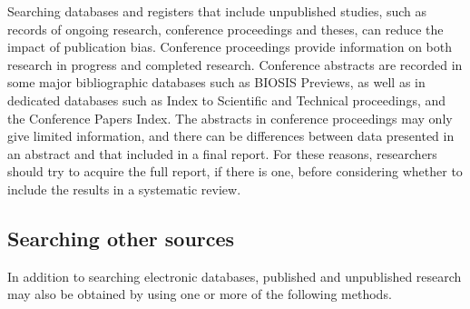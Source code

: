 \documentclass[
  11pt,
  a4paper,
  DIV=11,
  numbers=noendperiod]{scrreprt}
\begin{document}
Searching databases and registers that include unpublished studies, such
as records of ongoing research, conference proceedings and theses, can
reduce the impact of publication bias. Conference proceedings provide
information on both research in progress and completed research.
Conference abstracts are recorded in some major bibliographic databases
such as BIOSIS Previews, as well as in dedicated databases such as Index
to Scientific and Technical proceedings, and the Conference Papers
Index. The abstracts in conference proceedings may only give limited
information, and there can be differences between data presented in an
abstract and that included in a final report. For these reasons,
researchers should try to acquire the full report, if there is one,
before considering whether to include the results in a systematic
review.

\subsection{Searching other sources}\label{searching-other-sources}

In addition to searching electronic databases, published and unpublished
research may also be obtained by using one or more of the following
methods.
\end{document}
